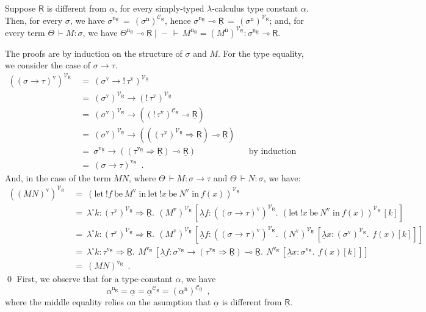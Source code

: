 \documentclass{LMCS}
\newcommand{\comptype}[1]{\underline{#1}}
\newcommand{\CR}{\comptype{\mathsf{R}}}
\newcommand{\Vfun}{\to}
\newcommand{\lpop}{\multimap}
\newcommand{\Cfun}{\Rightarrow}
\newcommand{\In}[2]{#1 \colon  \! #2}
\newcommand{\rIn}[2]{#1 \colon  #2}
\newcommand{\Ceq}[5]{#1 \mid  \! #2 \, \vdash \, #3 = #4 \colon #5}
\newcommand{\Veq}[4]{\Ceq{#1}{-}{#2}{#3}{#4}}
\newcommand{\Vappl}[2]{#1(#2)}
\newcommand{\compop}[1]{\underline{#1}}
\newcommand{\Clam}[3]{\compop{\lambda} \In{#1}{#2}.\: #3}
\newcommand{\bang}[1]{{! #1}}
\newcommand{\banglet}[3]{\mathrm{let}\: {\bang #1}\:\mathrm{be}\:{#2} \;\mathrm{in}\: #3}
\newcommand{\llambda}{\lambda^{\!\circ\!}}
\newcommand{\llam}[3]{\llambda \In{#1}{#2}.\: #3}
\newcommand{\lappl}[2]{#1[#2]}
\newcommand{\Lfun}{\to}
\newcommand{\Lj}[3]{#1  \, \vdash  \rIn{#2}{#3}}
\newcommand{\Lappl}[2]{#1  #2}
\newcommand{\cbv}[1]{#1^{\mathrm{v}}}
\newcommand{\cbn}[1]{#1^{\mathrm{n}}}
\newcommand{\cbvLincps}[1]{#1^{\mathrm{v_{\CR}}}}
\newcommand{\cbnLincps}[1]{#1^{\mathrm{n_{\CR}}}}
\newcommand{\CpsVT}[1]{#1^{\mathcal{V}_{\CR}}}
\newcommand{\CpsCT}[1]{#1^{\mathcal{C}_{\CR}}}
\newcommand{\CpsVTcbv}[1]{\CpsVT{(\cbv{#1})}}
\newcommand{\CpsCTcbn}[1]{\CpsCT{(\cbn{#1})}}
\newcommand{\CpsVTcbn}[1]{\CpsVT{(\cbn{#1})}}
\begin{document}
\begin{thm}[Recovering $\cbnLincps{(\cdot)}$]
\label{theorem:recover:cbn}
Suppose $\CR$ is different from $\comptype{\alpha}$, for every
simply-typed $\lambda$-calculus type constant $\alpha$.
Then, for every $\sigma$, 
we have 
$\cbnLincps{\sigma} \, = \, \CpsCTcbn{\sigma}$, hence
$\cbnLincps{\sigma} \lpop \CR \, = \, \CpsVTcbn{\sigma}$; and, for
every term $\Lj{\Theta}{M}{\sigma}$, we have 
$\Veq{\cbnLincps{\Theta} \lpop \CR}{\cbnLincps{M}}{\CpsVTcbn{M}}{\cbnLincps{\sigma}\lpop \CR}$.
\end{thm}
\noindent
The  proofs are by induction on the structure of $\sigma$ and $M$. 
For the type equality,  we consider the case of $\sigma \Lfun \tau$.
\begin{align*}
\CpsVTcbv{(\sigma \Lfun \tau)} \: & = \: \CpsVT{(\cbv{\sigma} \Vfun \bang{\,\cbv{\tau}})}
\\
& = \: \CpsVTcbv{\sigma} \Vfun \CpsVT{(\bang{\,\cbv{\tau}})} 
\\
& = \: \CpsVTcbv{\sigma} \Vfun (\CpsCT{(\bang{\,\cbv{\tau}})}  \lpop \CR)
\\
& = \: \CpsVTcbv{\sigma} \Vfun ((\CpsVTcbv{\tau} \Cfun \CR)  \lpop \CR)
\\ 
& = \: \cbvLincps{\sigma} \Vfun ((\cbvLincps{\tau} \Cfun \CR)  \lpop \CR)
& & \text{by induction hypothesis}
\\
& = \: \cbvLincps{(\sigma \Lfun \tau)} \enspace .
\end{align*}
And, in the case of the term $\Lappl{M}{N}$, where $\Lj{\Theta}{M}{\sigma \Lfun \tau}$
and $\Lj{\Theta}{N}{\sigma}$, we have:
\begin{align*}
\CpsVTcbv{(\Lappl{M}{N})} \: 
& = \:  \CpsVT{(\banglet{f}{\cbv{M}}{\banglet{x}{\cbv{N}}{\Vappl{f}{x}}})}
\\
& = \: \llam{k}{\CpsVTcbv{\tau} \Cfun \CR}
   {\,\lappl{\CpsVTcbv{M}\,}{\Clam{f}{\CpsVTcbv{(\sigma \Lfun \tau)}}
       {\,\lappl{\CpsVT{(\banglet{x}{\cbv{N}}{\Vappl{f}{x}})}\,}{k}}}}
\\
& = \: \llam{k}{\CpsVTcbv{\tau} \Cfun \CR}
   {\,\lappl{\CpsVTcbv{M}\,}{\Clam{f}{\CpsVTcbv{(\sigma \Lfun \tau)}}
       {\,\lappl{\CpsVTcbv{N}\,}{\Clam{x}{\CpsVTcbv{\sigma}}{\,\lappl{\Vappl{f}{x}}{k}}}}}}
\\
& = \: \llam{k}{\cbvLincps{\tau} \Cfun \CR}
     {\,\lappl{\cbvLincps{M}\,}{\Clam{f}{\cbvLincps{\sigma} \Vfun (\cbvLincps{\tau} \Cfun \CR) \lpop \CR}
         {\,\lappl{\cbvLincps{N}\,}{\Clam{x}{\cbvLincps{\sigma}}{\,\lappl{\Vappl{f}{x}}{k}}}}}} 
\\
& = \: \cbvLincps{(\Lappl{M}{N})} \enspace .
\end{align*}
\qed
{}
First, we observe that for a type-constant $\alpha$, we have
\[\cbnLincps{\alpha} = \comptype{\alpha} =  \CpsCT{\comptype{\alpha}} = \CpsCTcbn{\alpha} \enspace , \]
where the middle equality relies on the asumption that 
$\comptype{\alpha}$ is different from $\CR$.
\end{document}
